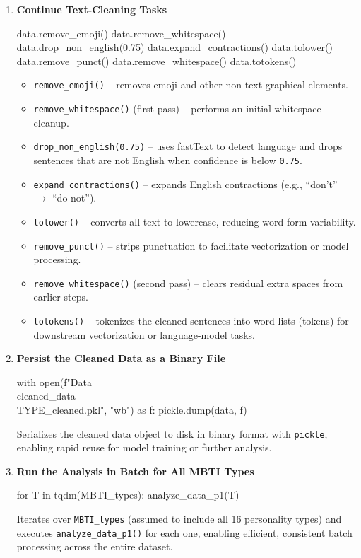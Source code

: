 \documentclass[12pt]{article}
\numberwithin{figure}{section}  %
\begin{document}
\begin{enumerate}
\item \textbf{Continue Text-Cleaning Tasks}

\begin{python}
data.remove_emoji()
data.remove_whitespace()
data.drop_non_english(0.75)
data.expand_contractions()
data.tolower()
data.remove_punct()
data.remove_whitespace()
data.totokens()
\end{python}

\begin{itemize}
  \item \texttt{remove\_emoji()} – removes emoji and other non-text graphical elements.
  \item \texttt{remove\_whitespace()} (first pass) – performs an initial whitespace cleanup.
  \item \texttt{drop\_non\_english(0.75)} – uses fastText to detect language and drops sentences that are not English when confidence is below \texttt{0.75}.
  \item \texttt{expand\_contractions()} – expands English contractions (e.g., ``don’t'' $\rightarrow$ ``do not'').
  \item \texttt{tolower()} – converts all text to lowercase, reducing word-form variability.
  \item \texttt{remove\_punct()} – strips punctuation to facilitate vectorization or model processing.
  \item \texttt{remove\_whitespace()} (second pass) – clears residual extra spaces from earlier steps.
  \item \texttt{totokens()} – tokenizes the cleaned sentences into word lists (tokens) for downstream vectorization or language-model tasks.
\end{itemize}

\item \textbf{Persist the Cleaned Data as a Binary File}

\begin{python}
with open(f"Data\\cleaned_data\\{TYPE}_cleaned.pkl", "wb") as f:
    pickle.dump(data, f)
\end{python}

Serializes the cleaned data object to disk in binary format with \texttt{pickle}, enabling rapid reuse for model training or further analysis.

\item \textbf{Run the Analysis in Batch for All MBTI Types}

\begin{python}
for T in tqdm(MBTI_types):
    analyze_data_p1(T)
\end{python}

Iterates over \texttt{MBTI\_types} (assumed to include all 16 personality types) and executes \texttt{analyze\_data\_p1()} for each one, enabling efficient, consistent batch processing across the entire dataset.
\end{enumerate}
\end{document}
